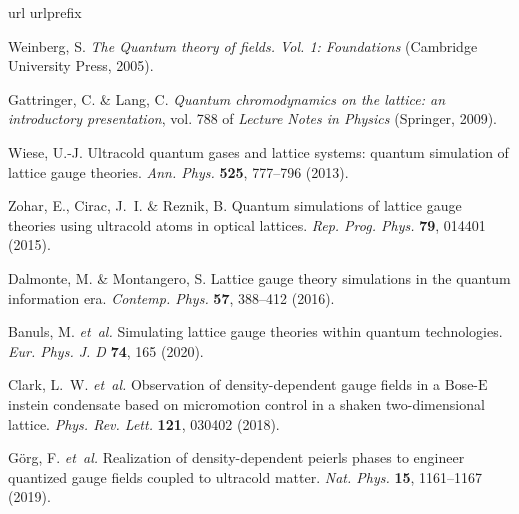\documentclass[aps,prl,twocolumn,superscriptaddress,footinbib,linenumbers]{revtex4}
\begin{document}
\begin{thebibliography}{10}
\expandafter\ifx\csname url\endcsname\relax
  \def\url#1{\texttt{#1}}\fi
\expandafter\ifx\csname urlprefix\endcsname\relax\def\urlprefix{URL }\fi
\providecommand{\bibinfo}[2]{#2}
\providecommand{\eprint}[2][]{\url{#2}}

 \bibinfo{author}{Weinberg, S.}
\newblock \emph{\bibinfo{title}{{The Quantum theory of fields. Vol. 1: Foundations}}} (\bibinfo{publisher}{Cambridge University Press}, \bibinfo{year}{2005}).

 \bibinfo{author}{Gattringer, C.} \& \bibinfo{author}{Lang, C.} \newblock \emph{\bibinfo{title}{Quantum chromodynamics on the lattice: an
  introductory presentation}}, vol. \bibinfo{volume}{788} of \emph{\bibinfo{series}{Lecture Notes in Physics}} (\bibinfo{publisher}{Springer}, \bibinfo{year}{2009}).

 \bibinfo{author}{Wiese, U.-J.} \newblock \bibinfo{title}{Ultracold quantum gases and lattice systems: quantum simulation of lattice gauge theories}.
\newblock \emph{\bibinfo{journal}{Ann. Phys.}} \textbf{\bibinfo{volume}{525}}, \bibinfo{pages}{777--796} (\bibinfo{year}{2013}).

 \bibinfo{author}{Zohar, E.}, \bibinfo{author}{Cirac, J.~I.} \& \bibinfo{author}{Reznik, B.}
\newblock \bibinfo{title}{Quantum simulations of lattice gauge theories using ultracold atoms in optical lattices}. \newblock \emph{\bibinfo{journal}{Rep. Prog. Phys.}}
  \textbf{\bibinfo{volume}{79}}, \bibinfo{pages}{014401} (\bibinfo{year}{2015}).

 \bibinfo{author}{Dalmonte, M.} \& \bibinfo{author}{Montangero, S.} \newblock \bibinfo{title}{Lattice gauge theory simulations in the quantum information era}.
\newblock \emph{\bibinfo{journal}{Contemp. Phys.}} \textbf{\bibinfo{volume}{57}}, \bibinfo{pages}{388--412} (\bibinfo{year}{2016}).

 Banuls, M. \emph{et~al.} Simulating lattice gauge theories within quantum technologies. \emph{Eur. Phys. J. D} \textbf{74}, 165 (2020).

 Clark, L.~W. \emph{et~al.} Observation of density-dependent gauge fields in a $\mathrm{B}$ose-$\mathrm{E}$instein condensate based on micromotion control in a shaken two-dimensional lattice. \emph{Phys. Rev. Lett.} \textbf{121}, 030402 (2018).

 \bibinfo{author}{G\"{o}rg, F.} \emph{et~al.} \newblock \bibinfo{title}{Realization of density-dependent peierls phases to engineer quantized gauge fields coupled to ultracold matter}. \newblock \emph{\bibinfo{journal}{Nat. Phys.}} \textbf{\bibinfo{volume}{15}}, \bibinfo{pages}{1161--1167} (\bibinfo{year}{2019}).


\end{thebibliography}
\end{document}
